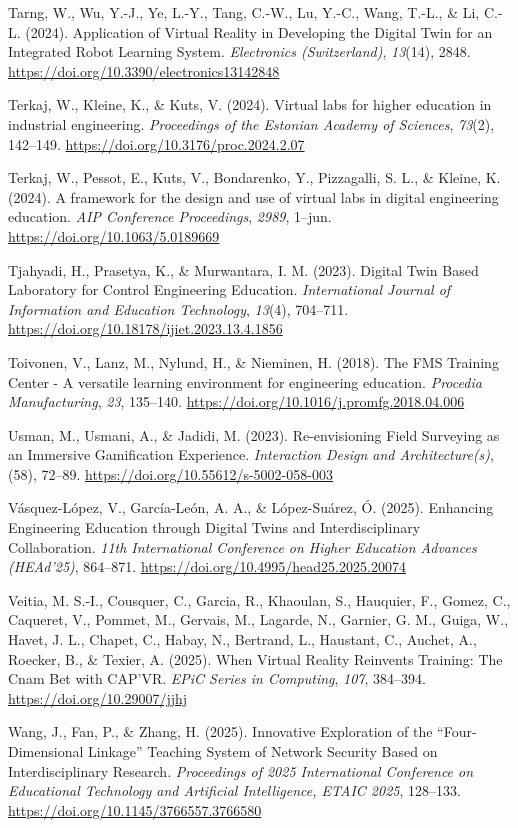 Tarng, W., Wu, Y.-J., Ye, L.-Y., Tang, C.-W., Lu, Y.-C., Wang, T.-L., \&
Li, C.-L. (2024). Application of Virtual Reality in Developing the
Digital Twin for an Integrated Robot Learning System. \emph{Electronics
(Switzerland)}, \emph{13}(14), 2848.
\url{https://doi.org/10.3390/electronics13142848}

Terkaj, W., Kleine, K., \& Kuts, V. (2024). Virtual labs for higher
education in industrial engineering. \emph{Proceedings of the Estonian
Academy of Sciences}, \emph{73}(2), 142--149.
\url{https://doi.org/10.3176/proc.2024.2.07}

Terkaj, W., Pessot, E., Kuts, V., Bondarenko, Y., Pizzagalli, S. L., \&
Kleine, K. (2024). A framework for the design and use of virtual labs in
digital engineering education. \emph{AIP Conference Proceedings}, \emph{2989},
1--jun. \url{https://doi.org/10.1063/5.0189669}

Tjahyadi, H., Prasetya, K., \& Murwantara, I. M. (2023). Digital Twin
Based Laboratory for Control Engineering Education. \emph{International
Journal of Information and Education Technology}, \emph{13}(4), 704--711.
\url{https://doi.org/10.18178/ijiet.2023.13.4.1856}

Toivonen, V., Lanz, M., Nylund, H., \& Nieminen, H. (2018). The FMS
Training Center - A versatile learning environment for engineering
education. \emph{Procedia Manufacturing}, \emph{23}, 135--140.
\url{https://doi.org/10.1016/j.promfg.2018.04.006}

Usman, M., Usmani, A., \& Jadidi, M. (2023). Re-envisioning Field
Surveying as an Immersive Gamification Experience. \emph{Interaction Design
and Architecture(s)}, (58), 72--89.
\url{https://doi.org/10.55612/s-5002-058-003}

Vásquez-López, V., García-León, A. A., \& López-Suárez, Ó. (2025).
Enhancing Engineering Education through Digital Twins and
Interdisciplinary Collaboration. \emph{11th International Conference on
Higher Education Advances (HEAd'25)}, 864--871.
\url{https://doi.org/10.4995/head25.2025.20074}

Veitia, M. S.-I., Cousquer, C., Garcia, R., Khaoulan, S., Hauquier, F.,
Gomez, C., Caqueret, V., Pommet, M., Gervais, M., Lagarde, N., Garnier,
G. M., Guiga, W., Havet, J. L., Chapet, C., Habay, N., Bertrand, L.,
Haustant, C., Auchet, A., Roecker, B., \& Texier, A. (2025). When Virtual
Reality Reinvents Training: The Cnam Bet with CAP'VR. \emph{EPiC Series in
Computing}, \emph{107}, 384--394. \url{https://doi.org/10.29007/jjhj}

Wang, J., Fan, P., \& Zhang, H. (2025). Innovative Exploration of the
``Four-Dimensional Linkage'' Teaching System of Network Security Based on
Interdisciplinary Research. \emph{Proceedings of 2025 International
Conference on Educational Technology and Artificial Intelligence, ETAIC
2025}, 128--133. \url{https://doi.org/10.1145/3766557.3766580}

